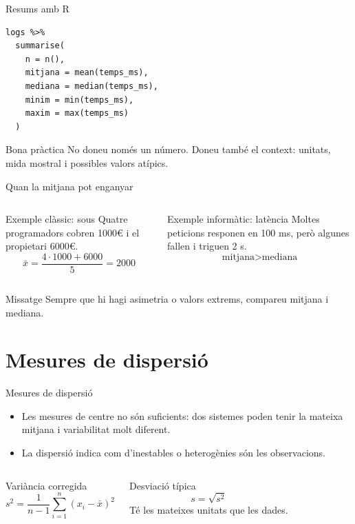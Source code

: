 \documentclass[10pt,aspectratio=169]{beamer}
\begin{document}
\begin{frame}[fragile]{Resums amb R}
\begin{lstlisting}
logs %>%
  summarise(
    n = n(),
    mitjana = mean(temps_ms),
    mediana = median(temps_ms),
    minim = min(temps_ms),
    maxim = max(temps_ms)
  )
\end{lstlisting}
\vspace{0.2cm}
\begin{block}{Bona pràctica}
No doneu només un número. Doneu també el context: unitats, mida mostral i possibles valors atípics.
\end{block}
\end{frame}

\begin{frame}{Quan la mitjana pot enganyar}
\begin{columns}[T]
\begin{block}{Exemple clàssic: sous}
Quatre programadors cobren 1000\euro{} i el propietari 6000\euro{}.
\[
\bar{x}=\frac{4\cdot 1000+6000}{5}=2000
\]
\end{block}
\begin{block}{Exemple informàtic: latència}
Moltes peticions responen en 100 ms, però algunes fallen i triguen 2 s.
\[
\text{mitjana} > \text{mediana}
\]
\end{block}
\end{columns}
\vspace{0.25cm}
\begin{alertblock}{Missatge}
Sempre que hi hagi asimetria o valors extrems, compareu mitjana i mediana.
\end{alertblock}
\end{frame}

\section{Mesures de dispersió}

\begin{frame}{Mesures de dispersió}
\begin{itemize}
  \item Les mesures de centre no són suficients: dos sistemes poden tenir la mateixa mitjana i variabilitat molt diferent.
  \item La dispersió indica com d'inestables o heterogènies són les observacions.
\end{itemize}
\vspace{0.25cm}
\begin{columns}[T]
\begin{block}{Variància corregida}
\[
s^2=\frac{1}{n-1}\sum_{i=1}^n (x_i-\bar{x})^2
\]
\end{block}
\begin{block}{Desviació típica}
\[
s=\sqrt{s^2}
\]
Té les mateixes unitats que les dades.
\end{block}
\end{columns}
\end{frame}
\end{document}
